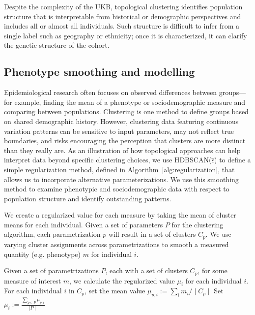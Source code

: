 Despite the complexity of the UKB, topological clustering identifies population structure that is interpretable from historical or demographic perspectives and includes all or almost all individuals. Such structure is difficult to infer from a single label such as geography or ethnicity; once it is characterized, it can clarify the genetic structure of the cohort. 

\subsection{Phenotype smoothing and modelling}

Epidemiological research often focuses on observed differences between groups---for example, finding the mean of a phenotype or sociodemographic measure and comparing between populations. Clustering is one method to define groups based on shared demographic history. However, clustering data featuring continuous variation patterns can be sensitive to input parameters, may not reflect true boundaries, and risks encouraging the perception that clusters are more distinct than they really are\citep{lewis_getting_2022}. As an illustration of how topological approaches can help interpret data beyond specific clustering choices, we use HDBSCAN($\hat{\epsilon}$) to define a simple regularization method, defined in Algorithm~\ref{alg:regularization}, that allows us to incorporate alternative parameterizations. We use this smoothing method to examine phenotypic and sociodemographic data with respect to population structure and identify outstanding patterns.

\clearpage

\begin{algorithm}
\caption{We create a regularized value for each measure by taking the mean of cluster means for each individual. Given a set of parameters $P$ for the clustering algorithm, each parametrization $p$ will result in a set of clusters $C_p$. We use varying cluster assignments across parametrizations to smooth a measured quantity (e.g. phenotype) $m$ for individual $i$.}
\label{alg:regularization}
\begin{algorithmic}
\State Given a set of parametrizations $P$, each with a set of clusters $C_p$, for some measure of interest $m$, we calculate the regularized value $\mu_i$ for each individual $i$.
\State For each individual $i$ in $C_p$, set the mean value $\mu_{p,i}:=\sum_{i}m_i/\mid C_p \mid $
\EndFor
\EndFor
\State Set $\mu_{i}:=\frac{\sum_{p \in P}\mu_{p,i}}{\mid P \mid}$
\end{algorithmic}
\end{algorithm}

